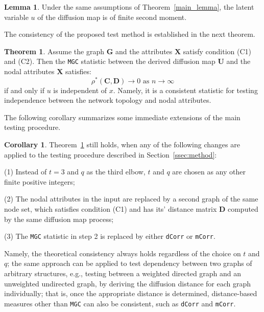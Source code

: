 \documentclass[12pt]{article}
\theoremstyle{definition}
\newtheorem{theorem}{Theorem}
\newtheorem{corollary}{Corollary}
\newtheorem{lemma}{Lemma}
\begin{document}
	\begin{lemma}
		\label{main_lemma_1}
		Under the same assumptions of Theorem~\ref{main_lemma}, the latent variable $u$ of the diffusion map is of finite second moment. 
	\end{lemma} 
	
	The consistency of the proposed test method is established in the next theorem.
	
	\begin{theorem}
		Assume the graph $\mathbf{G}$ and the attributes $\mathbf{X}$ satisfy condition (C1) and (C2). Then the \texttt{MGC} statistic between the derived diffusion map $\mathbf{U}$ and the nodal attributes $\mathbf{X}$ satisfies:
		\begin{equation}
			\rho^{*}(\mathbf{C}, \mathbf{D}) \longrightarrow 0 \mbox{ as } n \rightarrow \infty
		\end{equation}
		if and only if $u$ is independent of $x$. Namely, it is a consistent statistic for testing independence between the network topology and nodal attributes.
		\label{theoremMain}
	\end{theorem} 
	
	The following corollary summarizes some immediate extensions of the main testing procedure.
	
	\begin{corollary}
		\label{main_corollary}
		Theorem~\ref{theoremMain} still holds, when any of the following changes are applied to the testing procedure described in Section~\ref{ssec:method}:
		\begin{description}[align=left]
			\item [] (1) Instead of $t=3$ and $q$ as the third elbow, $t$ and $q$ are chosen as any other finite positive integers;
			
			\item [] (2) The nodal attributes in the input are replaced by a second graph of the same node set, which satisfies condition (C1) and has its' distance matrix $\mathbf{D}$ computed by the same diffusion map process;
			
			\item [] (3) The \texttt{MGC} statistic in step 2 is replaced by either \texttt{dCorr} or \texttt{mCorr}.
		\end{description}
	\end{corollary}
	
	Namely, the theoretical consistency always holds regardless of the choice on $t$ and $q$; the same approach can be applied to test dependency between two graphs of arbitrary structures, e.g., testing between a weighted directed graph and an unweighted undirected graph, by deriving the diffusion distance for each graph individually; that is, once the appropriate distance is determined, distance-based measures other than \texttt{MGC} can also be consistent, such as \texttt{dCorr} and \texttt{mCorr}. 
	
\end{document}
